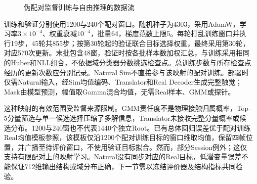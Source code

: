 \begin{figure}[htbp]
 \centering
 \caption{伪配对监督训练与自由推理的数据流}
 \label{fig:ch05_translator_paths}
\end{figure}

训练和验证分别使用1200与240个配对窗口。随机种子为4303，采用AdamW，学习率$3\times10^{-4}$、权重衰减$10^{-4}$，批量64，梯度范数上限5。每轮打乱训练窗口并执行19步，45轮共855步；按第30轮起的验证联合目标选择权重，最终采用第30轮，对应570次更新。末批包含48窗，验证时按各批样本数加权汇总，与训练采用相同的Huber和NLL组合，不依据域分类器分数挑选检查点。总训练步数与所存检查点经历的更新次数应分别记录。Natural Sim不直接参与该映射的配对训练。部署时仅需Natural输入，经Sim均值编码、Translator和Real Decoder生成完整触觉；Mask由模型预测，幅值取Gamma混合均值，无需Real样本、GMM或探针。

这种映射的有效范围受监督来源限制。GMM责任度不是物理接触归属概率，Top-5分量筛选与单一候选选择压缩了多解信息，Translator未接收完整分量概率或候选分布。1200与240窗也不代表1440个独立Root。已有总体回归误差优于配对训练Real均值模板参照，该模板仅沿1200个配对训练目标的窗口维取均值，保留四帧位置，并广播至待评价窗口，不使用验证目标拟合。然而，部分Session例外；这仅支持有限配对上的映射学习。Natural没有同步对应的Real目标，低潜变量误差不能保证712维输出结构或域分布正确，下一节需以冻结评价器及结构指标共同检验。
